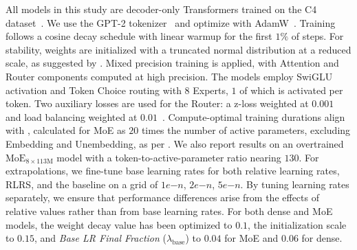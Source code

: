 \documentclass{article} %
\newcommand{\moe}[1]{$\text{MoE}_{8\times#1\text{M}}$}
\newcommand{\jl}[1]{\textcolor{green}{[JL: #1]}}
\newcommand{\jmr}[2]{\textcolor{purple}{[JM:] \sout{#1} #2}}
\begin{document}
    All models in this study are decoder-only Transformers trained on the C4 dataset~\citep{raffel2023exploring}. We use the GPT-2 tokenizer~\citep{radford2018improving} and optimize with AdamW~\citep{loshchilov2019decoupled}. Training follows a cosine decay schedule with linear warmup for the first $1\%$ of steps. For stability, weights are initialized with a truncated normal distribution at a reduced scale, as suggested by \citet{fedus2022switch}. Mixed precision training is applied, with Attention and Router components computed at high precision. The models employ SwiGLU activation and Token Choice routing with $8$ Experts, $1$ of which is activated per token. Two auxiliary losses are used for the Router: a z-loss weighted at $0.001$~\citep{zoph2022st} and load balancing weighted at $0.01$~\citep{fedus2022switch}. Compute-optimal training durations align with \citet{hoffmann2022training}, calculated for MoE as $20$ times the number of active parameters, excluding Embedding and Unembedding, as per \citet{ludziejewskiscaling}. We also report results on an overtrained \moe{113} model with a token-to-active-parameter ratio nearing $130$. For extrapolations, we fine-tune base learning rates for both relative learning rates, RLRS, and the baseline on a grid of {$1e{-n}$, $2e{-n}$, $5e{-n}$}. By tuning learning rates separately, we ensure that performance differences arise from the effects of relative values rather than from base learning rates.
    For both dense and MoE models, the weight decay value has been optimized to $0.1$, the initialization scale to $0.15$, and \textit{Base LR Final Fraction} ($\lambda_{\text{base}}$) to $0.04$ for MoE and $0.06$ for dense. 
\end{document}
